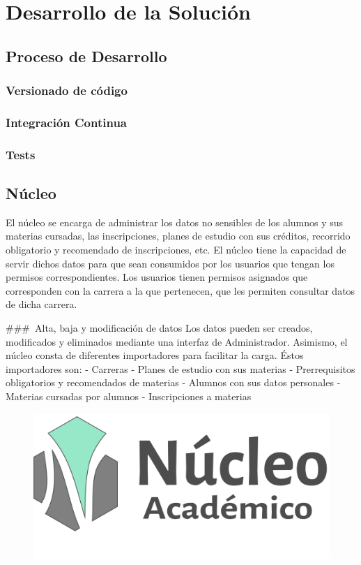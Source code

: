 \chapter{Desarrollo de la Solución}
\label{sec:desarrollo}

\section[Proceso de Desarrollo]{Proceso de Desarrollo}

\subsection{Versionado de código}

\subsection{Integración Continua}

\subsection{Tests}

\section[Núcleo]{Núcleo}

El núcleo se encarga de administrar los datos no sensibles de los alumnos y sus materias cursadas, las inscripciones, planes de estudio con sus créditos, recorrido obligatorio y recomendado de inscripciones, etc.
El núcleo tiene la capacidad de servir dichos datos para que sean consumidos por los usuarios que tengan los permisos correspondientes.
Los usuarios tienen permisos asignados que corresponden con la carrera a la que pertenecen, que les permiten consultar datos de dicha carrera. 

### Alta, baja y modificación de datos
Los datos pueden ser creados, modificados y eliminados mediante una interfaz de Administrador. Asimismo, el núcleo consta de diferentes importadores para facilitar la carga.
Éstos importadores son:
- Carreras
- Planes de estudio con sus materias
- Prerrequisitos obligatorios y recomendados de materias
- Alumnos con sus datos personales
- Materias cursadas por alumnos
- Inscripciones a materias


\begin{figure}[h!]
  \centering
    \includegraphics[scale=0.5]{images/nucleo/nucleo-fondoblanco.png}
  \label{fig:django}
\end{figure}

